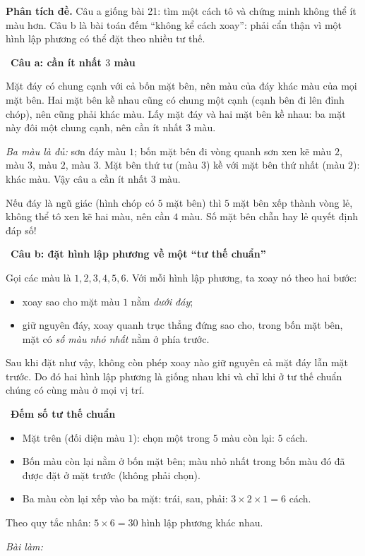 \documentclass[11pt]{article}
\newif\ifsol \solfalse
\newcommand{\StuProb}[2]{\begin{probboxS}{#1}{#2}\StuProbBody\end{probboxS}}
\newcommand{\probsol}[1]{%
  \begin{lrbox}{\solmeasure}\begin{minipage}{\dimexpr\linewidth-24pt\relax}#1\end{minipage}\end{lrbox}%
  \ifsol
    \begin{solbox}#1\end{solbox}%
  \else
    \setlength{\solht}{\dimexpr\ht\solmeasure+\dp\solmeasure+0.85cm\relax}%
    \ifdim\solht<1.35cm\setlength{\solht}{1.35cm}\fi
    \ifdim\solht>\StudentMaxWork\setlength{\solht}{\StudentMaxWork}\fi
    \par\noindent\begin{minipage}{\linewidth}%
    \expandafter\StuProb\StuProbArgs
    \begin{tcolorbox}[colback=white,colframe=Line,boxrule=0.8pt,arc=5pt,
      left=8pt,right=8pt,top=4pt,bottom=4pt,height=\solht]{\footnotesize\color{Slate}\itshape\WorkWord}\end{tcolorbox}%
    \end{minipage}\par\medskip
  \fi}
\newlength{\StudentMaxWork}\setlength{\StudentMaxWork}{4.5cm}
\newcommand{\step}[2]{\par\smallskip\noindent{\bfseries\color{tmBlue!85!black}\StepWord~#1.}\ {\bfseries #2}\par\nopagebreak}
\def\WorkWord{Bài làm:}
\def\StepWord{Bước}
\begin{document}
\probsol{
\textbf{Phân tích đề.} Câu a giống bài 21: tìm một cách tô và chứng minh không thể ít màu hơn. Câu b là bài toán đếm ``không kể
cách xoay'': phải cẩn thận vì một hình lập phương có thể đặt theo nhiều tư thế.

\step{1}{Câu a: cần ít nhất $3$ màu}
\begin{proofbox}Mặt đáy có chung cạnh với cả bốn mặt bên, nên màu của đáy khác màu của mọi mặt bên. Hai mặt bên kề nhau cũng có chung
một cạnh (cạnh bên đi lên đỉnh chóp), nên cũng phải khác màu. Lấy mặt đáy và hai mặt bên kề nhau: ba mặt này đôi một chung cạnh,
nên cần ít nhất $3$ màu.\end{proofbox}
\emph{Ba màu là đủ:} sơn đáy màu $1$; bốn mặt bên đi vòng quanh sơn xen kẽ màu $2$, màu $3$, màu $2$, màu $3$. Mặt bên thứ tư (màu $3$)
kề với mặt bên thứ nhất (màu $2$): khác màu. Vậy câu a cần ít nhất $3$ màu.
\begin{tipbox}Nếu đáy là ngũ giác (hình chóp có $5$ mặt bên) thì $5$ mặt bên xếp thành vòng lẻ, không thể tô xen kẽ hai màu,
nên cần $4$ màu. Số mặt bên chẵn hay lẻ quyết định đáp số!\end{tipbox}

\step{2}{Câu b: đặt hình lập phương về một ``tư thế chuẩn''}
Gọi các màu là $1,2,3,4,5,6$. Với mỗi hình lập phương, ta xoay nó theo hai bước:
\begin{itemize}[leftmargin=1.2em,itemsep=1pt,topsep=2pt]
\item xoay sao cho mặt màu $1$ nằm \emph{dưới đáy};
\item giữ nguyên đáy, xoay quanh trục thẳng đứng sao cho, trong bốn mặt bên, mặt có \emph{số màu nhỏ nhất} nằm ở phía trước.
\end{itemize}
Sau khi đặt như vậy, không còn phép xoay nào giữ nguyên cả mặt đáy lẫn mặt trước. Do đó hai hình lập phương là giống nhau khi và
chỉ khi ở tư thế chuẩn chúng có cùng màu ở mọi vị trí.

\step{3}{Đếm số tư thế chuẩn}
\begin{itemize}[leftmargin=1.2em,itemsep=1pt,topsep=2pt]
\item Mặt trên (đối diện màu $1$): chọn một trong $5$ màu còn lại: $5$ cách.
\item Bốn màu còn lại nằm ở bốn mặt bên; màu nhỏ nhất trong bốn màu đó đã được đặt ở mặt trước (không phải chọn).
\item Ba màu còn lại xếp vào ba mặt: trái, sau, phải: $3\times2\times1=6$ cách.
\end{itemize}
Theo quy tắc nhân: $5\times6=30$ hình lập phương khác nhau.

}
\end{document}
